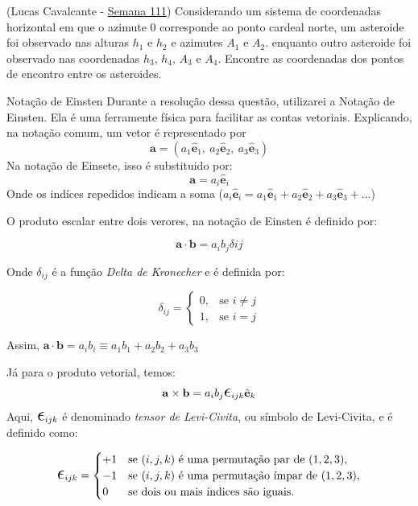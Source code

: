 \documentclass[11pt]{article}
\begin{document}
    \begin{pproblem}(Lucas Cavalcante - \href{https://noic.com.br/olimpiadas/astronomia/problemas-da-semana/astronomia-semana-111/}{Semana 111})
        Considerando um sistema de coordenadas horizontal em que o azimute \(0\) corresponde ao ponto cardeal norte, um asteroide foi observado nas alturas \(h_1\) e \(h_2\) e azimutes \(A_1\) e \(A_2\). enquanto outro asteroide foi observado nas coordenadas \(h_3\), \(h_4\), \(A_3\) e \(A_4\). Encontre as coordenadas dos pontos de encontro entre os asteroides.
        
        \begin{psidea}{Notação de Einsten}{}
        Durante a resolução dessa questão, utilizarei a Notação de Einsten. Ela é uma ferramente física para facilitar as contas vetoriais. Explicando, na notação comum, um vetor é representado por
        \[\mathbf{a} = (a_1 \hat{\mathbf{e}}_1, \ a_2 \hat{\mathbf{e}}_2, \ a_3 \hat{\mathbf{e}}_3)\]
        Na notação de Einsete, isso é substituido por:
        \[\mathbf{a} = a_i \hat{\mathbf{e}}_i\]
        Onde os indíces repedidos indicam a soma (\(a_i \hat{\mathbf{e}}_i = a_1 \hat{\mathbf{e}}_1+a_2 \hat{\mathbf{e}}_2+a_3 \hat{\mathbf{e}}_3+...\))
        
        O produto escalar entre dois verores, na notação de Einsten é definido por:

        \[\mathbf{a}\cdot \mathbf{b} = a_ib_j\delta{ij}\]

        Onde \(\delta_{ij}\) é a função \textit{Delta de Kronecher} e é definida por:

        \[\delta_{ij} = \left \{ \begin{matrix} 0, & \mbox{se } i \ne j \\ 
                                                1, & \mbox{se } i = j\end{matrix} \right.\]
            
        Assim, \(\mathbf{a}\cdot \mathbf{b} = a_ib_i \equiv a_1b_1 +a_2b_2 + a_3b_3\)

        Já para o produto vetorial, temos:
            \[
            \mathbf{a} \times \mathbf{b} = a_i b_j \Epsilon_{ijk} \hat{\mathbf{e}}_k
            \]
            Aqui, \(\Epsilon_{ijk}\) é denominado \textit{tensor de Levi-Civita}, ou símbolo de Levi-Civita, e é definido como:

            \[
            \Epsilon_{ijk} = 
            \begin{cases} 
            +1 & \text{se } (i, j, k) \text{ é uma permutação par de } (1, 2, 3), \\
            -1 & \text{se } (i, j, k) \text{ é uma permutação ímpar de } (1, 2, 3), \\
            0 & \text{se dois ou mais índices são iguais}.
            \end{cases}
            \]


\end{psidea}
\end{pproblem}
\end{document}
